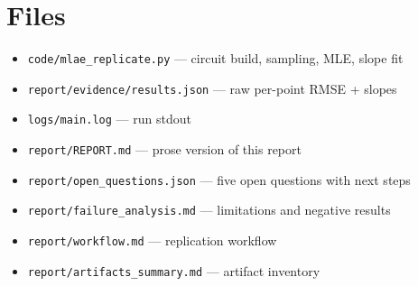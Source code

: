 \documentclass[11pt]{article}
\begin{document}
\section{Files}
\begin{itemize}
  \item \texttt{code/mlae\_replicate.py} --- circuit build, sampling, MLE, slope fit
  \item \texttt{report/evidence/results.json} --- raw per-point RMSE + slopes
  \item \texttt{logs/main.log} --- run stdout
  \item \texttt{report/REPORT.md} --- prose version of this report
  \item \texttt{report/open\_questions.json} --- five open questions with next steps
  \item \texttt{report/failure\_analysis.md} --- limitations and negative results
  \item \texttt{report/workflow.md} --- replication workflow
  \item \texttt{report/artifacts\_summary.md} --- artifact inventory
\end{itemize}
\end{document}
